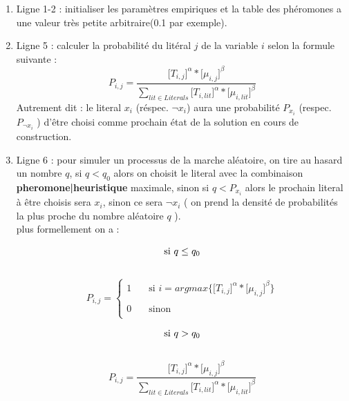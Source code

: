 	
	\begin{enumerate}
		\item Ligne 1-2 : initialiser les paramètres empiriques et la table des phéromones a une valeur très petite arbitraire(0.1 par exemple).
		\item Ligne 5 : calculer la probabilité du litéral $j$ de la variable $i$ selon la formule suivante : \\
		\begin{equation}
		P_{i,j} = \frac{\lbrack T_{i,j} \rbrack^{\alpha}* \lbrack\mu_{i,j}\rbrack^{\beta}}{\sum\limits_{lit \in Literals}{\lbrack T_{i,lit} \rbrack^{\alpha}* \lbrack\mu_{i,lit}\rbrack^{\beta}}}
		\end{equation}
		Autrement dit : le literal $x_{i}$ (réspec. $\lnot x_{i}$) aura une probabilité $P_{x_{i}}$ (respec. $P_{\lnot x_{i}}$ ) d'être choisi comme prochain état de la solution en cours de construction.
		
		\item Ligne 6 : pour simuler un processus de la marche aléatoire, on tire au hasard un nombre $q$, si $q<q_0$ alors on choisit le literal avec la combinaison \textbf{pheromone|heuristique} maximale, sinon si $q < P_{x_{i}}$ alors le prochain literal à être choisis sera $x_i$, sinon ce sera $\lnot x_i$ ( on prend la densité de probabilités la plus proche du nombre aléatoire $q$ ).\\
		plus formellement on a :
			 
			 
			\begin{equation*}
				\text{si }q \leq q_0 \\
			\end{equation*}
			\\
			\[   
			P_{i,j} = 
			\begin{cases}
			1 & \quad\text{si $i =$}argmax\lbrace\lbrack T_{i,j} \rbrack^{\alpha}* \lbrack\mu_{i,j}\rbrack^{\beta}\rbrace \\\\
			0 & \quad\text{sinon}\\
			\end{cases}
			\]
			
			\begin{equation*}
			\text{si } q > q_0 \\
			\end{equation*}
			\\
			\begin{equation*}
				P_{i,j} = 
				\frac{\lbrack T_{i,j} \rbrack^{\alpha}* \lbrack\mu_{i,j}\rbrack^{\beta}}{\sum\limits_{lit \in Literals}{\lbrack T_{i,lit} \rbrack^{\alpha}* \lbrack\mu_{i,lit}\rbrack^{\beta}}}
			\end{equation*}
			

\end{enumerate}
